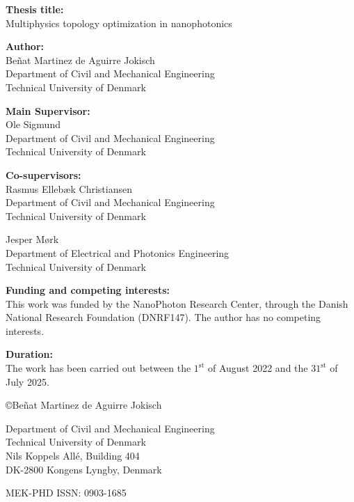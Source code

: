 \begin{titlingpage}
  \titleM
  \clearpage
  \noindent\textbf{Thesis title:} \\\noindent Multiphysics topology optimization in nanophotonics
  \vspace{1.0em}

  \noindent\textbf{Author:}\\\noindent Beñat Martinez de Aguirre Jokisch\\Department of Civil and Mechanical Engineering\\ Technical University of Denmark
  \vspace{0.5em}

  \noindent\textbf{Main Supervisor:}\\\noindent Ole Sigmund\\Department of Civil and Mechanical Engineering\\ Technical University of Denmark
  \vspace{0.5em}

  \noindent\textbf{Co-supervisors:}\\
  \noindent Rasmus Ellebæk Christiansen\\Department of Civil and Mechanical Engineering\\ Technical University of Denmark
  \vspace{0.25em}

  \noindent Jesper Mørk\\Department of Electrical and Photonics Engineering\\ Technical University of Denmark
  \vspace{0.5em}

  \noindent\textbf{Funding and competing interests:}\\\noindent This work was funded by the NanoPhoton Research Center, through the Danish National Research Foundation (DNRF147). The author has no competing interests.
  \vspace{1.0em}

  \noindent\textbf{Duration:}\\\noindent The work has been carried out between the $1^\text{st}$ of August 2022 and the $31^\text{st}$ of July 2025.
  \vspace{1.0em}

  \noindent \copyright Beñat Martinez de Aguirre Jokisch
  \vspace{1em}

  \noindent Department of Civil and Mechanical Engineering\\Technical University of Denmark\\ Nils Koppels Allé, Building 404 \\ DK-2800 Kongens Lyngby, Denmark
  \vspace{1em}

  \noindent MEK-PHD ISSN: 0903-1685
\end{titlingpage}
\setcounter{page}{3}
